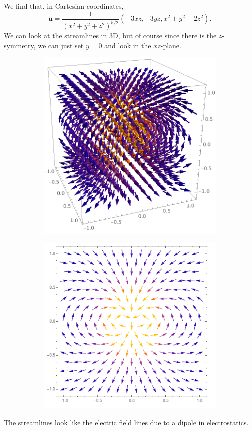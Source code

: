 \documentclass[11pt]{article}
\newcommand{\f}[2]{\frac{#1}{#2}}
\begin{document}
\begin{enumerate}[(a)]
	We find that, in Cartesian coordinates,
	\begin{equation*}
	\mathbf{u} = \f{1}{(x^2+y^2+z^2)^{5/2}}\left( -3xz, -3yz, x^2+y^2-2z^2 \right). 
	\end{equation*}
	We can look at the streamlines in 3D, but of course since there is the $z$-symmetry, we can just set $y=0$ and look in the $xz$-plane. 
	\begin{figure}[!htb]
		\centering
		\begin{subfigure}{0.49\textwidth}
			\includegraphics[scale=0.5]{stream3D}
		\end{subfigure}
		\begin{subfigure}{0.49\textwidth}
			\includegraphics[scale=0.6]{stream2D}
		\end{subfigure}
	\end{figure}
	The streamlines look like the electric field lines due to a dipole in electrostatics. 
	

\end{enumerate}
\end{document}
